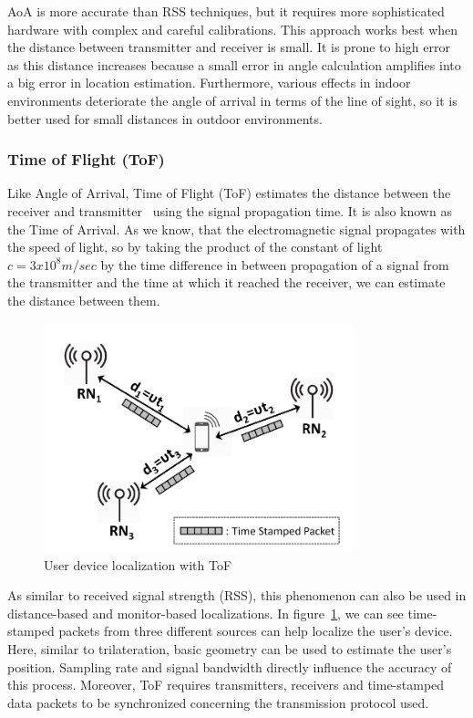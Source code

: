 \documentclass[a4paper,singleside,12pt]{report} %
\begin{document}
					AoA is more accurate than RSS techniques, but it requires more sophisticated hardware with complex and careful calibrations. 
					This approach works best when the distance between transmitter and receiver is small. 
					It is prone to high error~\cite{kumar2014accurate} as this distance increases because a small error in angle calculation amplifies into a big error in location estimation. 
					Furthermore, various effects in indoor environments deteriorate the angle of arrival in terms of the line of sight, so it is better used for small distances in outdoor environments. 

				\subsubsection{Time of Flight (ToF)}

					Like Angle of Arrival, Time of Flight (ToF) estimates the distance between the receiver and transmitter~\cite{dargie2010fundamentals} using the signal propagation time. 
					It is also known as the Time of Arrival. 
					As we know, that the electromagnetic signal propagates with the speed of light, so by taking the product of the constant of light $c = 3 x 10^8 m/sec$ by the time difference in between propagation of a signal from the transmitter and the time at which it reached the receiver, we can estimate the distance between them. 
					
					\begin{figure}[!htb]
					\centerline{\includegraphics[width=0.8\textwidth]{./figures/ToF-indoor-localization.png}}
					\caption{User device localization with ToF}
					\label{fig2.3}
					\end{figure}
					
					As similar to received signal strength (RSS), this phenomenon can also be used in distance-based and monitor-based localizations. 
					In figure~\ref{fig2.3}, we can see time-stamped packets from three different sources can help localize the user's device. 
					Here, similar to trilateration, basic geometry can be used to estimate the user's position. 
					Sampling rate and signal bandwidth directly influence the accuracy of this process. 
					Moreover, ToF requires transmitters, receivers and time-stamped data packets to be synchronized concerning the transmission protocol used. 
\end{document}
